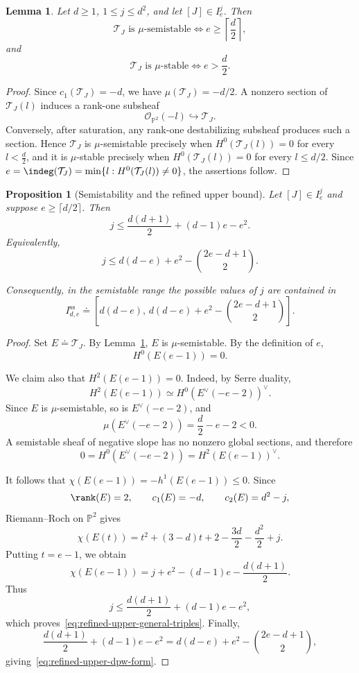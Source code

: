 \documentclass[11pt]{amsart} %
\newtheorem{Lemma}[Theorem]{Lemma}
\newtheorem{Proposition}[Theorem]{Proposition}
\theoremstyle{definition}
\def\NZQ{\mathbb}               %
\def\PP{{\NZQ P}}
\def\T{{\mathcal T}}
\begin{document}
\begin{Lemma}\label{lem:mu-semistability}
Let $d\geq1$, $1\leq j\leq d^2$, and let
$[J]\in I_e^j$. Then
\[
\T_J \text{ is $\mu$-semistable}
\iff
e\geq\left\lceil\frac d2\right\rceil,
\]
and
\[
\T_J \text{ is $\mu$-stable}
\iff
e>\frac d2.
\]
\end{Lemma}

\begin{proof}
Since \(c_1(\T_J)=-d\), we have \(\mu(\T_J)=-d/2\). A nonzero section of $\T_J(l)$ induces a rank-one subsheaf
\[
\mathcal O_{\PP^2}(-l)\hookrightarrow\T_J.
\]
Conversely, after saturation, any rank-one destabilizing subsheaf
produces such a section. Hence $\T_J$ is $\mu$-semistable precisely
when \(H^0(\T_J(l))=0\) for every \( l < \frac d2\), and it is $\mu$-stable precisely when
\(
H^0(\T_J(l))=0\) for every \(l\leq d/2\).
Since \( e=\indeg(\T_J)=
\min\{l:H^0(\T_J(l))\neq0\}
\), the assertions follow.
\end{proof}

\begin{Proposition}[Semistability and the refined upper bound]
\label{prop:semistable-refined-bound}
Let $[J]\in I_e^j$ and suppose \(
e\geq \lceil d/2\rceil\). Then
\begin{equation}\label{eq:refined-upper-general-triples}
j
\leq
\frac{d(d+1)}2+(d-1)e-e^2.
\end{equation}
Equivalently,
\begin{equation}\label{eq:refined-upper-dpw-form}
j
\leq
d(d-e)+e^2
-
\binom{2e-d+1}{2}.
\end{equation}

Consequently, in the semistable range the possible values of $j$ are
contained in
\begin{equation}\label{eq:semistable-refined-interval}
I^{\mathrm{ss}}_{d,e}
\doteq
\left[
d(d-e),\,
d(d-e)+e^2-\binom{2e-d+1}{2}
\right].
\end{equation}
\end{Proposition}

\begin{proof}
Set \(E\doteq\T_J\). By Lemma~\ref{lem:mu-semistability}, $E$ is $\mu$-semistable. By the
definition of $e$,
\[
H^0(E(e-1))=0.
\]

We claim also that \(H^2(E(e-1))=0\). Indeed, by Serre duality,
\[
H^2(E(e-1))
\simeq
H^0(E^\vee(-e-2))^\vee.
\]
Since $E$ is $\mu$-semistable, so is
$E^\vee(-e-2)$, and
\[
\mu(E^\vee(-e-2))
=
\frac d2-e-2<0.
\]
A semistable sheaf of negative slope has no nonzero global sections,
and therefore
\[
0=H^0(E^\vee(-e-2)) = H^2(E(e-1))^\vee.
\]

It follows that \(\chi(E(e-1))=-h^1(E(e-1))\leq0\). Since
\[
\rank(E)=2,\qquad
c_1(E)=-d,\qquad
c_2(E)=d^2-j,
\]
Riemann--Roch on $\PP^2$ gives
\[
\chi(E(t))
=
t^2+(3-d)t
+
2-\frac{3d}{2}-\frac{d^2}{2}+j.
\]
Putting $t=e-1$, we obtain
\[
\chi(E(e-1))
=
j+e^2-(d-1)e-\frac{d(d+1)}2.
\]
Thus
\[
j
\leq
\frac{d(d+1)}2+(d-1)e-e^2,
\]
which proves~\eqref{eq:refined-upper-general-triples}. Finally,
\[
\frac{d(d+1)}2+(d-1)e-e^2
=
d(d-e)+e^2
-
\binom{2e-d+1}{2},
\]
giving~\eqref{eq:refined-upper-dpw-form}.
\end{proof}
\end{document}
